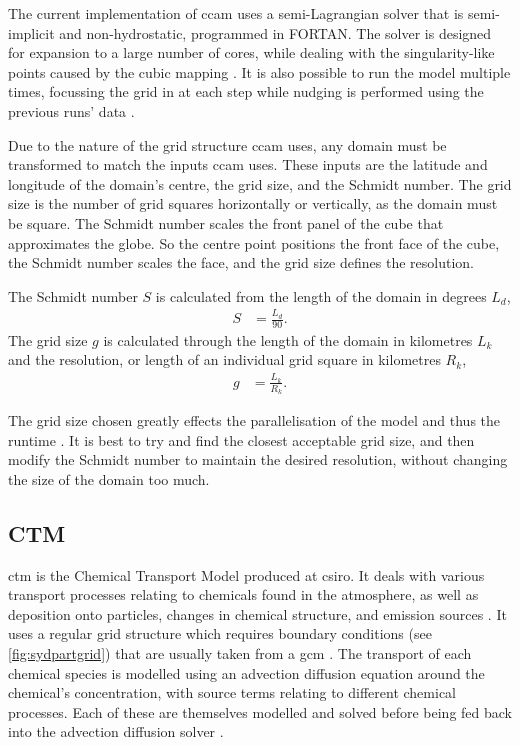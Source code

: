 	The current implementation of \gls{ccam} uses a semi-Lagrangian solver that is semi-implicit and non-hydrostatic, programmed in FORTAN. The solver is designed for expansion to a large number of cores, while dealing with the singularity-like points caused by the cubic mapping \citep{thatcher:2015wy}. It is also possible to run the model multiple times, focussing the grid in at each step while nudging is performed using the previous runs' data \citep{mcgregor2008updated}.

	Due to the nature of the grid structure \gls{ccam} uses, any domain must be transformed to match the inputs \gls{ccam} uses. These inputs are the latitude and longitude of the domain's centre, the grid size, and the Schmidt number. The grid size is the number of grid squares horizontally or vertically, as the domain must be square. The Schmidt number scales the front panel of the cube that approximates the globe. So the centre point positions the front face of the cube, the Schmidt number scales the face, and the grid size defines the resolution. 

	The Schmidt number $S$ is calculated from the length of the domain in degrees $L_d$, 
	\begin{align}
		\label{eq:schmidtnum}
		S &= \frac{L_d}{90}.
	\end{align}
	The grid size $g$ is calculated through the length of the domain in kilometres $L_k$ and the resolution, or length of an individual grid square in kilometres $R_k$,
	\begin{align}
		\label{eq:schmidtnum}
		g &= \frac{L_k}{R_k}.
	\end{align}

	The grid size chosen greatly effects the parallelisation of the model and thus the runtime \citep{thatcher:2015wy}. It is best to try and find the closest acceptable grid size, and then modify the Schmidt number to maintain the desired resolution, without changing the size of the domain too much.



	\subsection{CTM}
	\label{subsec:ctm}

	\gls{ctm} is the Chemical Transport Model produced at \gls{csiro}. It deals with various transport processes relating to chemicals found in the atmosphere, as well as deposition onto particles, changes in chemical structure, and emission sources \citep{cope:2009tz}. It uses a regular grid structure which requires boundary conditions (see \cref{fig:sydpartgrid}) that are usually taken from a \gls{gcm} \citep{cope:2014tw}. The transport of each chemical species is modelled using an advection diffusion equation around the chemical's concentration, with source terms relating to different chemical processes. Each of these are themselves modelled and solved before being fed back into the advection diffusion solver \citep{cope:2009tz}. 

